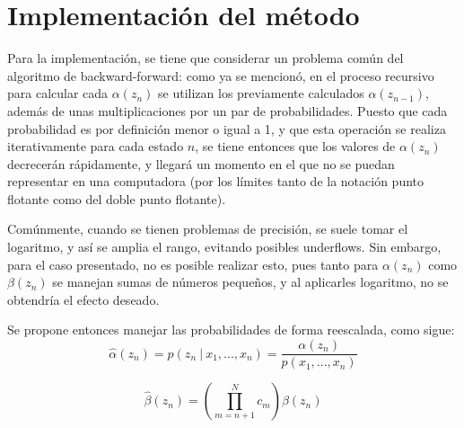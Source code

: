 \section{Implementación del método} %
\label{sec:implementacion}

Para la implementación, se tiene que considerar un problema común del algoritmo de backward-forward: como ya se mencionó, en el proceso recursivo para calcular cada $\alpha(z_n)$ se utilizan los previamente calculados $\alpha(z_{n-1})$, además de unas multiplicaciones por un par de probabilidades. Puesto que cada probabilidad es por definición menor o igual a 1, y que esta operación se realiza iterativamente para cada estado $n$, se tiene entonces que los valores de $\alpha(z_n)$ decrecerán rápidamente, y llegará un momento en el que no se puedan representar en una computadora (por los límites tanto de la notación punto flotante como del doble punto flotante).

Comúnmente, cuando se tienen problemas de precisión, se suele tomar el logaritmo, y así se amplia el rango, evitando posibles underflows. Sin embargo, para el caso presentado, no es posible realizar esto, pues tanto para 
$\alpha(z_n)$ como $\beta(z_n)$ se manejan sumas de números pequeños, y al aplicarles logaritmo, no se obtendría el efecto deseado.

Se propone entonces manejar las probabilidades de forma reescalada, como sigue:
\begin{equation}
  \hat \alpha(z_n) = p(z_n ~|~ x_1, ..., x_n )
    = \frac{\alpha(z_n)}{p(x_1, ..., x_n)}
  \label{eqn:3-28}
\end{equation}

\begin{equation}
  \hat \beta(z_n) = \left( \prod_{m=n+1}^N c_m \right) \beta(z_n)
  \label{eqn:3-29}
\end{equation}


